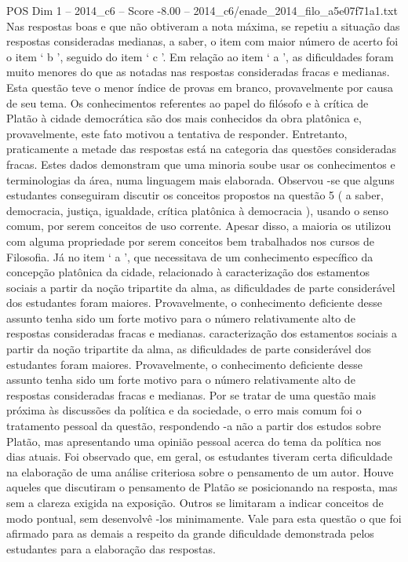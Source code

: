 \begin{textsample}{POS Dim 1 – 2014\_c6 – Score -8.00 – 2014\_c6/enade\_2014\_filo\_a5e07f71a1.txt}
Nas respostas boas e que não obtiveram a nota máxima, se repetiu a situação das respostas consideradas medianas, a saber, o item com maior número de acerto foi o item ‘ b ’, seguido do item ‘ c ’.
Em relação ao item ‘ a ’, as dificuldades foram muito menores do que as notadas nas respostas consideradas fracas e medianas.
Esta questão teve o menor índice de provas em branco, provavelmente por causa de seu tema.
Os conhecimentos referentes ao papel do filósofo e à crítica de Platão à cidade democrática são dos mais conhecidos da obra platônica e, provavelmente, este fato motivou a tentativa de responder.
Entretanto, praticamente a metade das respostas está na categoria das questões consideradas fracas.
Estes dados demonstram que uma minoria soube usar os conhecimentos e terminologias da área, numa linguagem mais elaborada.
Observou -se que alguns estudantes conseguiram discutir os conceitos propostos na questão 5 ( a saber, democracia, justiça, igualdade, crítica platônica à democracia ), usando o senso comum, por serem conceitos de uso corrente.
Apesar disso, a maioria os utilizou com alguma propriedade por serem conceitos bem trabalhados nos cursos de Filosofia.
Já no item ‘ a ’, que necessitava de um conhecimento específico da concepção platônica da cidade, relacionado à caracterização dos estamentos sociais a partir da noção tripartite da alma, as dificuldades de parte considerável dos estudantes foram maiores.
Provavelmente, o conhecimento deficiente desse assunto tenha sido um forte motivo para o número relativamente alto de respostas consideradas fracas e medianas. caracterização dos estamentos sociais a partir da noção tripartite da alma, as dificuldades de parte considerável dos estudantes foram maiores.
Provavelmente, o conhecimento deficiente desse assunto tenha sido um forte motivo para o número relativamente alto de respostas consideradas fracas e medianas.
Por se tratar de uma questão mais próxima às discussões da política e da sociedade, o erro mais comum foi o tratamento pessoal da questão, respondendo -a não a partir dos estudos sobre Platão, mas apresentando uma opinião pessoal acerca do tema da política nos dias atuais.
Foi observado que, em geral, os estudantes tiveram certa dificuldade na elaboração de uma análise criteriosa sobre o pensamento de um autor.
Houve aqueles que discutiram o pensamento de Platão se posicionando na resposta, mas sem a clareza exigida na exposição.
Outros se limitaram a indicar conceitos de modo pontual, sem desenvolvê -los minimamente.
Vale para esta questão o que foi afirmado para as demais a respeito da grande dificuldade demonstrada pelos estudantes para a elaboração das respostas.

\end{textsample}

